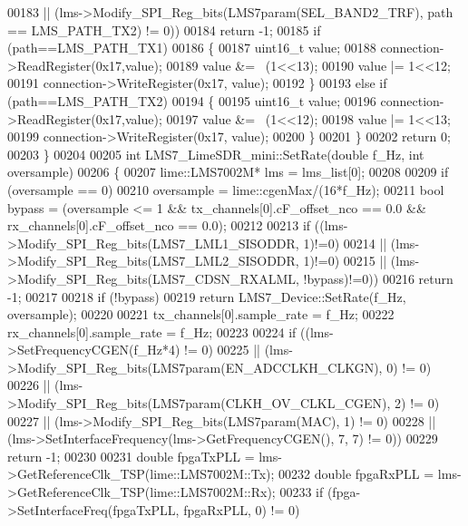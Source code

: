 \begin{DoxyCode}
00183         || (lms->Modify_SPI_Reg_bits(LMS7param(SEL_BAND2_TRF), path == 
      LMS_PATH_TX2) != 0))
00184             \textcolor{keywordflow}{return} -1;
00185         \textcolor{keywordflow}{if} (path==LMS_PATH_TX1)
00186         \{
00187             uint16\_t value;
00188             connection->ReadRegister(0x17,value);
00189             value &= ~(1<<13);
00190             value |= 1<<12;
00191             connection->WriteRegister(0x17, value);
00192         \}
00193         \textcolor{keywordflow}{else} \textcolor{keywordflow}{if} (path==LMS_PATH_TX2)
00194         \{
00195             uint16\_t value;
00196             connection->ReadRegister(0x17,value);
00197             value &= ~(1<<12);
00198             value |= 1<<13;
00199             connection->WriteRegister(0x17, value);
00200         \}
00201     \}
00202     \textcolor{keywordflow}{return} 0;
00203 \}
00204 
00205 \textcolor{keywordtype}{int} LMS7_LimeSDR_mini::SetRate(\textcolor{keywordtype}{double} f\_Hz, \textcolor{keywordtype}{int} oversample)
00206 \{
00207     lime::LMS7002M* lms = lms_list[0];
00208 
00209     \textcolor{keywordflow}{if} (oversample == 0)
00210         oversample = lime::cgenMax/(16*f\_Hz);
00211     \textcolor{keywordtype}{bool} bypass = (oversample <= 1 && tx_channels[0].cF\_offset\_nco == 0.0 && 
      rx_channels[0].cF\_offset\_nco == 0.0);
00212 
00213     \textcolor{keywordflow}{if} ((lms->Modify_SPI_Reg_bits(LMS7_LML1_SISODDR, 1)!=0)
00214         || (lms->Modify_SPI_Reg_bits(LMS7_LML2_SISODDR, 1)!=0)
00215         || (lms->Modify_SPI_Reg_bits(LMS7_CDSN_RXALML, !bypass)!=0))
00216             \textcolor{keywordflow}{return} -1;
00217 
00218     \textcolor{keywordflow}{if} (!bypass)
00219         \textcolor{keywordflow}{return} LMS7_Device::SetRate(f\_Hz, oversample);
00220 
00221     tx_channels[0].sample\_rate = f\_Hz;
00222     rx_channels[0].sample\_rate = f\_Hz;
00223 
00224     \textcolor{keywordflow}{if} ((lms->SetFrequencyCGEN(f\_Hz*4) != 0)
00225         || (lms->Modify_SPI_Reg_bits(LMS7param(EN_ADCCLKH_CLKGN), 0) != 0)
00226         || (lms->Modify_SPI_Reg_bits(LMS7param(CLKH_OV_CLKL_CGEN), 2) != 0)
00227         || (lms->Modify_SPI_Reg_bits(LMS7param(MAC), 1) != 0)
00228         || (lms->SetInterfaceFrequency(lms->GetFrequencyCGEN(), 7, 7) != 0))
00229         \textcolor{keywordflow}{return} -1;
00230 
00231      \textcolor{keywordtype}{double} fpgaTxPLL = lms->GetReferenceClk_TSP(lime::LMS7002M::Tx);
00232      \textcolor{keywordtype}{double} fpgaRxPLL = lms->GetReferenceClk_TSP(lime::LMS7002M::Rx);
00233      \textcolor{keywordflow}{if} (fpga->SetInterfaceFreq(fpgaTxPLL, fpgaRxPLL, 0) != 0)

\end{DoxyCode}

